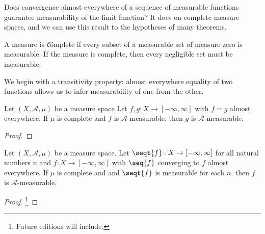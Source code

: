 

Does convergence almost everywhere of a sequence of measurable functions guarantee measurability of the limit function?
It does on complete measure spaces, and we can use this result to  the hypotheses of many theorems.


A measure is \t{complete} if every subset of a measurable set of measure zero is measurable.
If the measure is complete, then every negligible set must be measurable.

We begin with a transitivity property: almost everywhere equality of two functions allows us to infer measurability of one from the other.

\begin{prop}
Let $(X, \mathcal{A}, \mu)$ be a measure space
Let $f,g: X \to [-\infty, \infty]$
with $f = g$ almost everywhere.
If $\mu$ is complete
and $f$ is $\mathcal{A}$-measurable,
then $g$ is $\mathcal{A}$-measurable.
\begin{proof}
\end{proof}
\end{prop}

\begin{prop}
Let $(X, \mathcal{A}, \mu)$ be a measure space.
Let $\seqt{f}: X \to [-\infty, \infty]$ for all
natural numbers $n$
and $f: X \to [-\infty, \infty]$
with
$\seq{f}$ converging to $f$ almost everywhere.
If $\mu$ is complete and
and $\seqt{f}$ is measurable for each $n$,
then $f$ is $\mathcal{A}$-measurable.
  \begin{proof}\footnote{Future editions will include.}
\end{proof}
\end{prop}

\blankpage
